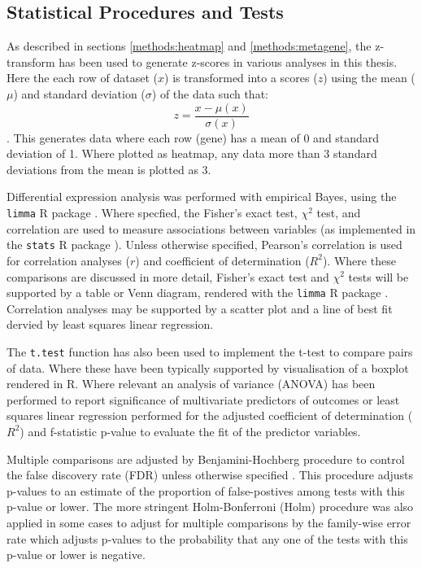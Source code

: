 \subsection{Statistical Procedures and Tests}

As described in sections \ref{methods:heatmap} and \ref{methods:metagene}, the z-transform has been used to generate z-scores in various analyses in this thesis. Here the each row of dataset ($x$) is transformed into a scores ($z$) using the mean ($\mu$) and standard deviation ($\sigma$) of the data such that: $$ z = \frac{x - \mu(x)}{\sigma(x)} $$. This generates data where each row (gene) has a mean of 0 and standard deviation of 1. Where plotted as heatmap, any data more than 3 standard deviations from the mean is plotted as 3.

Differential expression analysis was performed with empirical Bayes, using the \texttt{limma} R package \cite{limma}. Where specfied, the Fisher's exact test, $\chi^2$ test, and correlation are used to measure associations between variables (as implemented in the \texttt{stats} R package \cite{R_core}). Unless otherwise specified, Pearson's correlation is used for correlation analyses ($r$) and coefficient of determination ($R^2$). Where these comparisons are discussed in more detail, Fisher's exact test and $\chi^2$ tests will be supported by a table or Venn diagram, rendered with the \texttt{limma} R package \cite{limma}. Correlation analyses may be supported by a scatter plot and a line of best fit dervied by least squares linear regression. 

The \texttt{t.test} function \cite{R_core} has also been used to implement the t-test to compare pairs of data. Where these have been typically supported by visualisation of a boxplot rendered in R. Where relevant an analysis of variance (ANOVA) has been performed to report significance of multivariate predictors of outcomes or least squares linear regression performed for the adjusted coefficient of determination ($R^2$) and f-statistic p-value to evaluate the fit of the predictor variables.

Multiple comparisons are adjusted by Benjamini-Hochberg procedure to control the false discovery rate (FDR) unless otherwise specified \cite{fdr1995}. This procedure adjusts p-values to an estimate of the proportion of false-postives among tests with this p-value or lower. The more stringent Holm-Bonferroni (Holm) procedure \cite{Holm1979} was also applied in some cases to adjust for multiple comparisons by the family-wise error rate which adjusts p-values to the probability that any one of the tests with this p-value or lower is negative.

